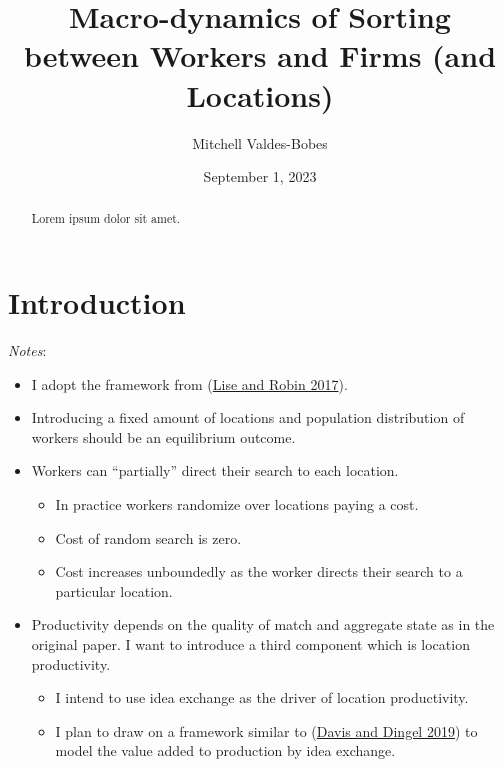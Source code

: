 \documentclass[
  letterpaper,
  DIV=11,
  numbers=noendperiod]{scrreprt}
\title{Macro-dynamics of Sorting between Workers and Firms (and
Locations)}
\author{Mitchell Valdes-Bobes}
\date{September 1, 2023}
\providecommand{\tightlist}{%
  \setlength{\itemsep}{0pt}\setlength{\parskip}{0pt}}\usepackage{longtable,booktabs,array}
\renewcommand*\contentsname{Table of contents}
\newcommand\contentsname{Table of contents}
\begin{document}
\maketitle
\begin{abstract}
Lorem ipsum dolor sit amet.
\end{abstract}
\ifdefined\Shaded\renewenvironment{Shaded}{\begin{tcolorbox}[boxrule=0pt, interior hidden, enhanced, breakable, borderline west={3pt}{0pt}{shadecolor}, frame hidden, sharp corners]}{\end{tcolorbox}}\fi

\renewcommand*\contentsname{Table of contents}
{
\hypersetup{linkcolor=}
\setcounter{tocdepth}{2}
\tableofcontents
}

\hypertarget{introduction}{%
\chapter{Introduction}\label{introduction}}

\emph{Notes}:

\begin{itemize}
\tightlist
\item
  I adopt the framework from
  (\protect\hyperlink{ref-liseMacrodynamicsSortingWorkers2017}{Lise and
  Robin 2017}).
\item
  Introducing a fixed amount of locations and population distribution of
  workers should be an equilibrium outcome.
\item
  Workers can ``partially'' direct their search to each location.

  \begin{itemize}
  \tightlist
  \item
    In practice workers randomize over locations paying a cost.
  \item
    Cost of random search is zero.
  \item
    Cost increases unboundedly as the worker directs their search to a
    particular location.
  \end{itemize}
\item
  Productivity depends on the quality of match and aggregate state as in
  the original paper. I want to introduce a third component which is
  location productivity.

  \begin{itemize}
  \tightlist
  \item
    I intend to use idea exchange as the driver of location
    productivity.
  \item
    I plan to draw on a framework similar to
    (\protect\hyperlink{ref-davisSpatialKnowledgeEconomy2019}{Davis and
    Dingel 2019}) to model the value added to production by idea
    exchange.
  \end{itemize}
\end{itemize}
\end{document}
